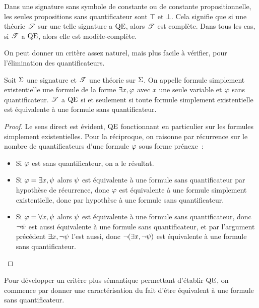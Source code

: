 \begin{remark}
  Dans une signature sans symbole de constante ou de constante propositionnelle,
  les seules propositions sans quantificateur sont $\top$ et $\bot$. Cela
  signifie que si une théorie $\mathscr T$ sur une telle signature a $\operatorname{QE}$, alors
  $\mathscr T$ est complète. Dans tous les cas, si $\mathscr T$ a $\operatorname{QE}$, alors elle est
  modèle-complète.
\end{remark}

On peut donner un critère assez naturel, mais plus facile à vérifier, pour
l'élimination des quantificateurs.

\begin{proposition}
  Soit $\Sigma$ une signature et $\mathscr T$ une théorie sur $\Sigma$.
  On appelle formule simplement existentielle une formule de la forme
  $\exists x, \varphi$ avec $x$ une seule variable et $\varphi$ sans
  quantificateur.
  $\mathscr T$ a $\operatorname{QE}$ si et seulement si toute formule simplement existentielle
  est équivalente à une formule sans quantificateur.
\end{proposition}

\begin{proof}
  Le sens direct est évident, $\operatorname{QE}$ fonctionnant en particulier sur les
  formules simplement existentielles. Pour la réciproque, on raisonne par
  récurrence sur le nombre de quantificateurs d'une formule $\varphi$ sous forme
  prénexe~:
  \begin{itemize}
  \item Si $\varphi$ est sans quantificateur, on a le résultat.
  \item Si $\varphi = \exists x, \psi$ alors $\psi$ est équivalente à une
    formule sans quantificateur par hypothèse de récurrence, donc $\varphi$ est
    équivalente à une formule simplement existentielle, donc par hypothèse à
    une formule sans quantificateur.
  \item Si $\varphi = \forall x, \psi$ alors $\psi$ est équivalente à une
    formule sans quantificateur, donc $\lnot\psi$ est aussi équivalente à une
    formule sans quantificateur, et par l'argument précédent
    $\exists x, \lnot\psi$ l'est aussi, donc $\lnot(\exists x, \lnot\psi)$
    est équivalente à une formule sans quantificateur.\qedhere
  \end{itemize}
\end{proof}

Pour développer un critère plus sémantique permettant d'établir $\operatorname{QE}$, on
commence par donner une caractérisation du fait d'être équivalent à une
formule sans quantificateur.

